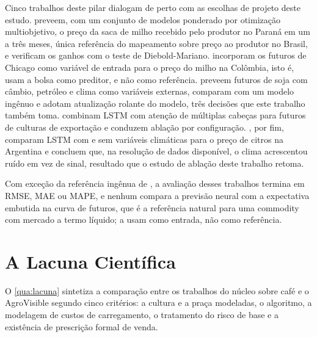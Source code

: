 Cinco trabalhos deste pilar dialogam de perto com as escolhas de projeto deste estudo.  preveem, com um conjunto de modelos ponderado por otimização multiobjetivo, o preço da saca de milho recebido pelo produtor no Paraná em um a três meses, única referência do mapeamento sobre preço ao produtor no Brasil, e verificam os ganhos com o teste de Diebold-Mariano.  incorporam os futuros de Chicago como variável de entrada para o preço do milho na Colômbia, isto é, usam a bolsa como preditor, e não como referência.  preveem futuros de soja com câmbio, petróleo e clima como variáveis externas, comparam com um modelo ingênuo e adotam atualização rolante do modelo, três decisões que este trabalho também toma.  combinam LSTM com atenção de múltiplas cabeças para futuros de culturas de exportação e conduzem ablação por configuração. , por fim, comparam LSTM com e sem variáveis climáticas para o preço de citros na Argentina e concluem que, na resolução de dados disponível, o clima acrescentou ruído em vez de sinal, resultado que o estudo de ablação deste trabalho retoma.

Com exceção da referência ingênua de , a avaliação desses trabalhos termina em RMSE, MAE ou MAPE, e nenhum compara a previsão neural com a expectativa embutida na curva de futuros, que é a referência natural para uma commodity com mercado a termo líquido;  a usam como entrada, não como referência.

\section{A Lacuna Científica}\label{sec2:lacuna}

O \autoref{qua:lacuna} sintetiza a comparação entre os trabalhos do núcleo sobre café e o AgroVisible segundo cinco critérios: a cultura e a praça modeladas, o algoritmo, a modelagem de custos de carregamento, o tratamento do risco de base e a existência de prescrição formal de venda.

